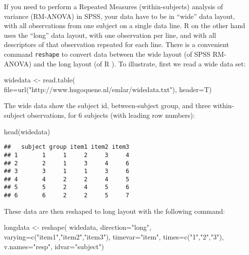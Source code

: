 \documentclass[
]{book}
\newenvironment{Shaded}{\begin{snugshade}}{\end{snugshade}}
\newcommand{\AttributeTok}[1]{\textcolor[rgb]{0.77,0.63,0.00}{#1}}
\newcommand{\FunctionTok}[1]{\textcolor[rgb]{0.00,0.00,0.00}{#1}}
\newcommand{\NormalTok}[1]{#1}
\newcommand{\OtherTok}[1]{\textcolor[rgb]{0.56,0.35,0.01}{#1}}
\newcommand{\StringTok}[1]{\textcolor[rgb]{0.31,0.60,0.02}{#1}}
\begin{document}
If you need to perform a
Repeated Measures (within-subjects) analysis of variance (RM-ANOVA)
in SPSS, your data have to be in ``wide'' data layout, with all
observations from one subject on a single data line.
R on the other hand uses the ``long'' data layout, with
one observation per line, and with all descriptors of that
observation repeated for each line. There is a convenient command
\texttt{reshape} to convert data between the wide
layout (of SPSS RM-ANOVA) and the long layout (of R ).
To illustrate, first we read a wide data set:

\begin{Shaded}
\begin{Highlighting}[]
\NormalTok{widedata }\OtherTok{\textless{}{-}} \FunctionTok{read.table}\NormalTok{( }
  \AttributeTok{file=}\FunctionTok{url}\NormalTok{(}\StringTok{"http://www.hugoquene.nl/emlar/widedata.txt"}\NormalTok{),}
  \AttributeTok{header=}\NormalTok{T)}
\end{Highlighting}
\end{Shaded}

The wide data show the subject id, between-subject group, and three
within-subject observations, for 6 subjects (with leading row
numbers):

\begin{Shaded}
\begin{Highlighting}[]
\FunctionTok{head}\NormalTok{(widedata)}
\end{Highlighting}
\end{Shaded}

\begin{verbatim}
##   subject group item1 item2 item3
## 1       1     1     2     3     4
## 2       2     1     3     4     6
## 3       3     1     1     3     6
## 4       4     2     2     4     5
## 5       5     2     4     5     6
## 6       6     2     2     5     7
\end{verbatim}

These data are then reshaped to long layout with the following
command:

\begin{Shaded}
\begin{Highlighting}[]
\NormalTok{longdata }\OtherTok{\textless{}{-}} \FunctionTok{reshape}\NormalTok{( widedata, }\AttributeTok{direction=}\StringTok{"long"}\NormalTok{,}
                     \AttributeTok{varying=}\FunctionTok{c}\NormalTok{(}\StringTok{"item1"}\NormalTok{,}\StringTok{"item2"}\NormalTok{,}\StringTok{"item3"}\NormalTok{),}
                     \AttributeTok{timevar=}\StringTok{"item"}\NormalTok{, }\AttributeTok{times=}\FunctionTok{c}\NormalTok{(}\StringTok{"1"}\NormalTok{,}\StringTok{"2"}\NormalTok{,}\StringTok{"3"}\NormalTok{),}
                     \AttributeTok{v.names=}\StringTok{"resp"}\NormalTok{, }\AttributeTok{idvar=}\StringTok{"subject"}\NormalTok{)}
\end{Highlighting}
\end{Shaded}
\end{document}
